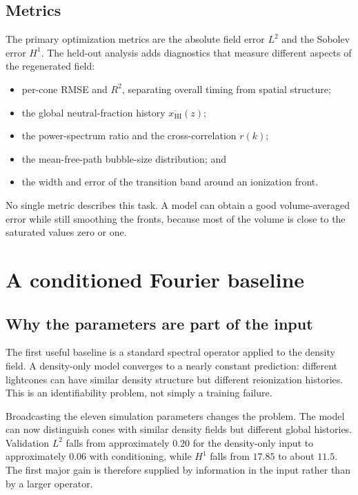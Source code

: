 \documentclass[11pt,a4paper]{article}
\newcommand{\xhi}{x_{\mathrm{HI}}}
\newcommand{\Ltwo}{L^2}
\newcommand{\Hone}{H^1}
\begin{document}
\subsection{Metrics}

The primary optimization metrics are the absolute field error \(\Ltwo\) and
the Sobolev error \(\Hone\). The held-out analysis adds diagnostics that
measure different aspects of the regenerated field:
\begin{itemize}
  \item per-cone RMSE and \(R^2\), separating overall timing from spatial
  structure;
  \item the global neutral-fraction history \(\overline{\xhi}(z)\);
  \item the power-spectrum ratio and the cross-correlation \(r(k)\);
  \item the mean-free-path bubble-size distribution; and
  \item the width and error of the transition band around an ionization front.
\end{itemize}
No single metric describes this task. A model can obtain a good volume-averaged
error while still smoothing the fronts, because most of the volume is close to
the saturated values zero or one.

\section{A conditioned Fourier baseline}

\subsection{Why the parameters are part of the input}

The first useful baseline is a standard spectral operator applied to the
density field. A density-only model converges to a nearly constant prediction:
different lightcones can have similar density structure but different
reionization histories. This is an identifiability problem, not simply a
training failure.

Broadcasting the eleven simulation parameters changes the problem. The model
can now distinguish cones with similar density fields but different global
histories. Validation \(\Ltwo\) falls from approximately \(0.20\) for the
density-only input to approximately \(0.06\) with conditioning, while
\(\Hone\) falls from \(17.85\) to about \(11.5\). The first major gain is
therefore supplied by information in the input rather than by a larger
operator.
\end{document}
